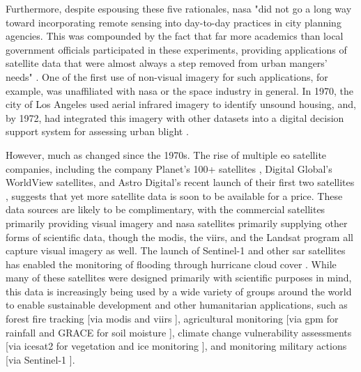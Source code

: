 Furthermore, despite espousing these five rationales, \ac{nasa} "did not go a long way toward incorporating remote sensing into day-to-day practices in city planning agencies. This was compounded by the fact that far more academics than local government officials participated in these experiments, providing applications of satellite data that were almost always a step removed from urban mangers' needs" \cite{lightWarfareWelfareDefense2005}. One of the first use of non-visual imagery for such applications, for example, was unaffiliated with \ac{nasa} or the space industry in general. In 1970, the city of Los Angeles used aerial infrared imagery to identify unsound housing, and, by 1972, had integrated this imagery with other datasets into a digital decision support system for assessing urban blight \cite{lightWarfareWelfareDefense2005}.

However, much as changed since the 1970s. The rise of multiple \ac{eo} satellite companies, including the company Planet's 100+ satellites \cite{tepperSatelliteMakerPlanet2015}, Digital Global's WorldView satellites, and Astro Digital’s recent launch of their first two satellites \cite{shieberAstroDigitalLaunched2017}, suggests that yet more satellite data is soon to be available for a price. These data sources are likely to be complimentary, with the commercial satellites primarily providing visual imagery and \ac{nasa} satellites primarily supplying other forms of scientific data, though the \ac{modis}, the \ac{viirs}, and the Landsat program all capture visual imagery as well. The launch of Sentinel-1 and other \ac{sar} satellites has enabled the monitoring of flooding through hurricane cloud cover \cite{zhangMappingExtentMagnitude2018}. While many of these satellites were designed primarily with scientific purposes in mind, this data is increasingly being used by a wide variety of groups around the world to enable sustainable development and other humanitarian applications, such as forest fire tracking [via \ac{modis} and \ac{viirs} \cite{schroederNewVIIRS375m2014}], agricultural monitoring [via \ac{gpm} for rainfall \cite{houGlobalPrecipitationMeasurement2014} and GRACE for soil moisture \cite{wahrTimevariableGravityGRACE2004}], climate change vulnerability assessments [via \ac{icesat2} for vegetation and ice monitoring \cite{mcgillMultipleAltimeterBeam2013}], and monitoring military actions [via Sentinel-1 \cite{sanchezSARSupportWar2022}].


